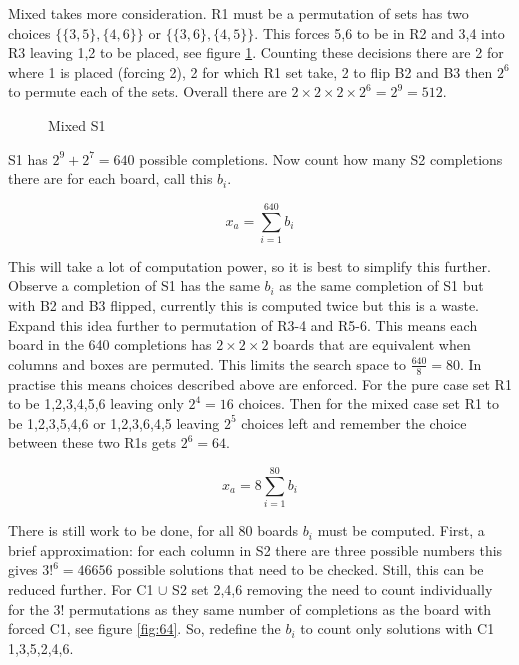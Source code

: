 \documentclass[a4paper,11pt]{report}
\newcounter{row}
\newcounter{col}
\newcommand\setrow[9]{
\setcounter{col}{1}
\foreach \n in {#1, #2, #3, #4, #5, #6, #7, #8, #9} {
\edef\x{\value{col} - 0.5}
\edef\y{9.5 - \value{row}}
\node[anchor=center] at (\x, \y) {\n};
\stepcounter{col}
}
\stepcounter{row}
}
\begin{document}
Mixed takes more consideration. R1 must be a permutation of sets has two choices $\{\{3,5\},\{4,6\}\}$ or $\{\{3,6\},\{4,5\}\}$. This forces 5,6 to be in R2 and 3,4 into R3 leaving 1,2 to be placed, see figure \ref{fig:63}. Counting these decisions there are 2 for where 1 is placed (forcing 2), 2 for which R1 set take, 2 to flip B2 and B3 then $2^6$ to permute each of the sets. Overall there are $2\times 2 \times 2 \times 2^6=2^9=512$. 

\begin{figure}[h]
\centering
{}
\caption{Mixed S1}
\label{fig:63}
\end{figure}

S1 has $2^9+2^7=640$ possible completions. Now count how many S2 completions there are for each board, call this $b_i$.

\begin{equation}x_a = \sum^{640}_{i=1}b_i\end{equation}

This will take a lot of computation power, so it is best to simplify this further. Observe a completion of S1 has the same $b_i$ as the same completion of S1 but with B2 and B3 flipped, currently this is computed twice but this is a waste. Expand this idea further to permutation of R3-4 and R5-6. This means each board in the 640 completions has $2\times 2\times 2$ boards that are equivalent when columns and boxes are permuted. This limits the search space to $\frac{640}{8}=80$. In practise this means choices described above are enforced. For the pure case set R1 to be 1,2,3,4,5,6 leaving only $2^4=16$ choices. Then for the mixed case set R1 to be 1,2,3,5,4,6 or 1,2,3,6,4,5 leaving $2^5$ choices left and remember the choice between these two R1s gets $2^6=64$. 

\begin{equation}x_a=8\sum^{80}_{i=1}b_i\end{equation}

There is still work to be done, for all 80 boards $b_i$ must be computed. First, a brief approximation: for each column in S2 there are three possible numbers this gives $3!^6 = 46656$ possible solutions that need to be checked. Still, this can be reduced further. For C1 $\cup$ S2 set 2,4,6 removing the need to count individually for the 3! permutations as they same number of completions as the board with forced C1, see figure \ref{fig:64}. So, redefine the $b_i$ to count only solutions with C1 1,3,5,2,4,6.
\end{document}
